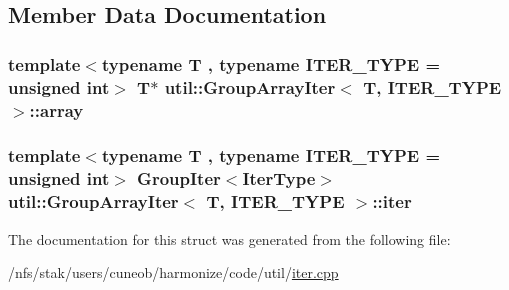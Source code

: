 \subsection{Member Data Documentation}
\hypertarget{structutil_1_1GroupArrayIter_adf4e06f1ee63dc9c6c2532e183eb9e81}{
\subsubsection[{array}]{\setlength{\rightskip}{0pt plus 5cm}template$<$typename T , typename I\-T\-E\-R\-\_\-\-T\-Y\-P\-E  = unsigned int$>$ T$\ast$ {\bf util\-::\-Group\-Array\-Iter}$<$ T, I\-T\-E\-R\-\_\-\-T\-Y\-P\-E $>$\-::array}}\label{structutil_1_1GroupArrayIter_adf4e06f1ee63dc9c6c2532e183eb9e81}
\hypertarget{structutil_1_1GroupArrayIter_af1a5c6d6428cd51e501f506231f3e203}{
\subsubsection[{iter}]{\setlength{\rightskip}{0pt plus 5cm}template$<$typename T , typename I\-T\-E\-R\-\_\-\-T\-Y\-P\-E  = unsigned int$>$ {\bf Group\-Iter}$<${\bf Iter\-Type}$>$ {\bf util\-::\-Group\-Array\-Iter}$<$ T, I\-T\-E\-R\-\_\-\-T\-Y\-P\-E $>$\-::iter}}\label{structutil_1_1GroupArrayIter_af1a5c6d6428cd51e501f506231f3e203}


The documentation for this struct was generated from the following file\-:\begin{DoxyCompactItemize}
\item 
/nfs/stak/users/cuneob/harmonize/code/util/\hyperlink{iter_8cpp}{iter.\-cpp}\end{DoxyCompactItemize}

